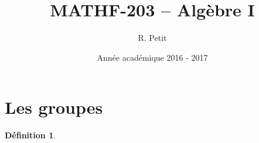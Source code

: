 \documentclass{article}
\title{MATHF-203 -- Algèbre I}
\date{Année académique 2016 - 2017}
\author{R. Petit}
\theoremstyle{definition}
\newtheorem{déf}[thm]{Définition}
\theoremstyle{remark}
\begin{document}
\maketitle
\tableofcontents
\newpage
{}
\setcounter{page}{1}

\section{Les groupes}
	\begin{déf}
	\end{déf}
\end{document}
